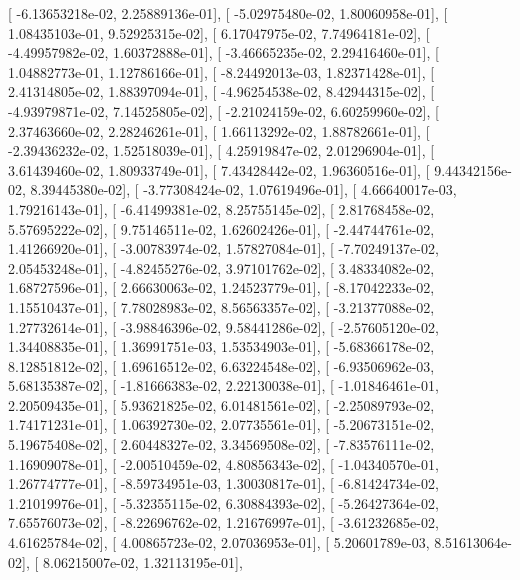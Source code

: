 \documentclass{article}
\begin{document}
       [ -6.13653218e-02,   2.25889136e-01],
       [ -5.02975480e-02,   1.80060958e-01],
       [  1.08435103e-01,   9.52925315e-02],
       [  6.17047975e-02,   7.74964181e-02],
       [ -4.49957982e-02,   1.60372888e-01],
       [ -3.46665235e-02,   2.29416460e-01],
       [  1.04882773e-01,   1.12786166e-01],
       [ -8.24492013e-03,   1.82371428e-01],
       [  2.41314805e-02,   1.88397094e-01],
       [ -4.96254538e-02,   8.42944315e-02],
       [ -4.93979871e-02,   7.14525805e-02],
       [ -2.21024159e-02,   6.60259960e-02],
       [  2.37463660e-02,   2.28246261e-01],
       [  1.66113292e-02,   1.88782661e-01],
       [ -2.39436232e-02,   1.52518039e-01],
       [  4.25919847e-02,   2.01296904e-01],
       [  3.61439460e-02,   1.80933749e-01],
       [  7.43428442e-02,   1.96360516e-01],
       [  9.44342156e-02,   8.39445380e-02],
       [ -3.77308424e-02,   1.07619496e-01],
       [  4.66640017e-03,   1.79216143e-01],
       [ -6.41499381e-02,   8.25755145e-02],
       [  2.81768458e-02,   5.57695222e-02],
       [  9.75146511e-02,   1.62602426e-01],
       [ -2.44744761e-02,   1.41266920e-01],
       [ -3.00783974e-02,   1.57827084e-01],
       [ -7.70249137e-02,   2.05453248e-01],
       [ -4.82455276e-02,   3.97101762e-02],
       [  3.48334082e-02,   1.68727596e-01],
       [  2.66630063e-02,   1.24523779e-01],
       [ -8.17042233e-02,   1.15510437e-01],
       [  7.78028983e-02,   8.56563357e-02],
       [ -3.21377088e-02,   1.27732614e-01],
       [ -3.98846396e-02,   9.58441286e-02],
       [ -2.57605120e-02,   1.34408835e-01],
       [  1.36991751e-03,   1.53534903e-01],
       [ -5.68366178e-02,   8.12851812e-02],
       [  1.69616512e-02,   6.63224548e-02],
       [ -6.93506962e-03,   5.68135387e-02],
       [ -1.81666383e-02,   2.22130038e-01],
       [ -1.01846461e-01,   2.20509435e-01],
       [  5.93621825e-02,   6.01481561e-02],
       [ -2.25089793e-02,   1.74171231e-01],
       [  1.06392730e-02,   2.07735561e-01],
       [ -5.20673151e-02,   5.19675408e-02],
       [  2.60448327e-02,   3.34569508e-02],
       [ -7.83576111e-02,   1.16909078e-01],
       [ -2.00510459e-02,   4.80856343e-02],
       [ -1.04340570e-01,   1.26774777e-01],
       [ -8.59734951e-03,   1.30030817e-01],
       [ -6.81424734e-02,   1.21019976e-01],
       [ -5.32355115e-02,   6.30884393e-02],
       [ -5.26427364e-02,   7.65576073e-02],
       [ -8.22696762e-02,   1.21676997e-01],
       [ -3.61232685e-02,   4.61625784e-02],
       [  4.00865723e-02,   2.07036953e-01],
       [  5.20601789e-03,   8.51613064e-02],
       [  8.06215007e-02,   1.32113195e-01],
\end{document}
